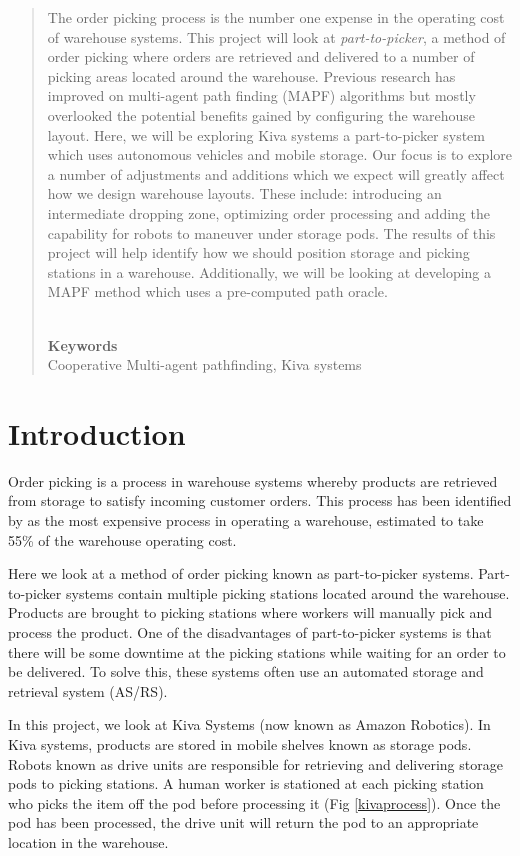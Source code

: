 \documentclass[a4paper,11pt]{article}
\begin{document}
	\begin{abstract} %
	
	\noindent The order picking process is the number one expense in the operating cost of warehouse systems. This project will look at \textit{part-to-picker}, a method of order picking where orders are retrieved and delivered to a number of picking areas located around the warehouse. Previous research has improved on multi-agent path finding (MAPF) algorithms but mostly overlooked the potential benefits gained by configuring the warehouse layout.
	Here, we will be exploring Kiva systems a part-to-picker system which uses autonomous vehicles and mobile storage. Our focus is to explore a number of adjustments and additions which we expect will greatly affect how we design warehouse layouts.
	These include: introducing an intermediate dropping zone, optimizing order processing and adding the capability for robots to maneuver under storage pods.
	The results of this project will help identify how we should position storage and picking stations in a warehouse. Additionally, we will be looking at developing a MAPF method which uses a pre-computed path oracle.
	
	\noindent \\ \textbf{Keywords} \\
	Cooperative Multi-agent pathfinding, Kiva systems
	
\end{abstract}
\section{Introduction}
Order picking is a process in warehouse systems whereby products are retrieved from storage to satisfy incoming customer orders. This process has been identified by \cite{de2007design} as the most expensive process in operating a warehouse, estimated to take 55\% of the warehouse operating cost.

Here we look at a method of order picking known as part-to-picker systems. Part-to-picker systems contain multiple picking stations located around the warehouse. Products are brought to picking stations where workers will manually pick and process the product. One of the disadvantages of part-to-picker systems is that there will be some downtime at the picking stations while waiting for an order to be delivered. To solve this, these systems often use an automated storage and retrieval system (AS/RS).

In this project, we look at Kiva Systems (now known as Amazon Robotics). In Kiva systems, products are stored in mobile shelves known as storage pods. Robots known as drive units are responsible for retrieving and delivering storage pods to picking stations. A human worker is stationed at each picking station who picks the item off the pod before processing it (Fig \ref{kivaprocess}). Once the pod has been processed, the drive unit will return the pod to an appropriate location in the warehouse.
\end{document}
